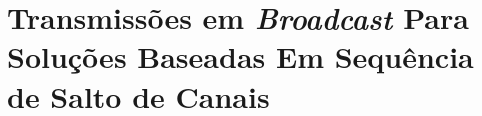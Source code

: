\chapter{Transmissões em \textit{Broadcast} Para Soluções Baseadas Em Sequência de Salto de Canais}
\label{cap:broadcast}











%





